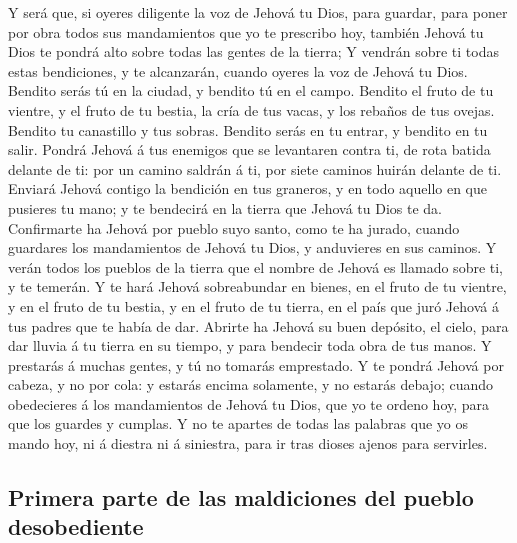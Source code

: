  Y será que, si oyeres diligente la voz de Jehová tu Dios,
para guardar, para poner por obra todos sus mandamientos que yo te
prescribo hoy, también Jehová tu Dios te pondrá alto sobre todas las
gentes de la tierra;  Y vendrán sobre ti todas estas
bendiciones, y te alcanzarán, cuando oyeres la voz de Jehová tu Dios.
 Bendito serás tú en la ciudad, y bendito tú en el campo.
 Bendito el fruto de tu vientre, y el fruto de tu bestia, la
cría de tus vacas, y los rebaños de tus ovejas.  Bendito tu
canastillo y tus sobras.  Bendito serás en tu entrar, y
bendito en tu salir.  Pondrá Jehová á tus enemigos que se
levantaren contra ti, de rota batida delante de ti: por un camino
saldrán á ti, por siete caminos huirán delante de ti. 
Enviará Jehová contigo la bendición en tus graneros, y en todo aquello
en que pusieres tu mano; y te bendecirá en la tierra que Jehová tu Dios
te da.  Confirmarte ha Jehová por pueblo suyo santo, como te
ha jurado, cuando guardares los mandamientos de Jehová tu Dios, y
anduvieres en sus caminos.  Y verán todos los pueblos de la
tierra que el nombre de Jehová es llamado sobre ti, y te temerán.
 Y te hará Jehová sobreabundar en bienes, en el fruto de tu
vientre, y en el fruto de tu bestia, y en el fruto de tu tierra, en el
país que juró Jehová á tus padres que te había de dar. 
Abrirte ha Jehová su buen depósito, el cielo, para dar lluvia á tu
tierra en su tiempo, y para bendecir toda obra de tus manos. Y prestarás
á muchas gentes, y tú no tomarás emprestado.  Y te pondrá
Jehová por cabeza, y no por cola: y estarás encima solamente, y no
estarás debajo; cuando obedecieres á los mandamientos de Jehová tu Dios,
que yo te ordeno hoy, para que los guardes y cumplas.  Y no
te apartes de todas las palabras que yo os mando hoy, ni á diestra ni á
siniestra, para ir tras dioses ajenos para servirles.

\hypertarget{primera-parte-de-las-maldiciones-del-pueblo-desobediente}{%
\subsection{Primera parte de las maldiciones del pueblo
desobediente}\label{primera-parte-de-las-maldiciones-del-pueblo-desobediente}}

